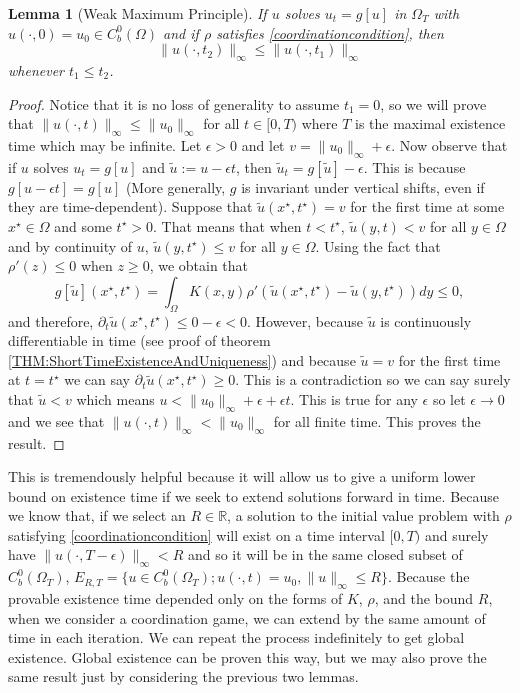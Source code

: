 \documentclass[aps,
preprint,
groupedaddress,
showkeys,
amsmath]{revtex4-2}
\newtheorem{lemma}{Lemma}
\begin{document}
\begin{lemma}[Weak Maximum Principle]\label{LEM:MaximumPrinciple}
        If $u$ solves $u_t = g[u]$ in $\Omega_T$ with $u(\cdot, 0)=u_0\in C^0_b(\Omega)$ and if $\rho$ satisfies \eqref{coordinationcondition}, then 
       \[\|u(\cdot, t_2)\|_\infty\leq\| u(\cdot , t_1)\|_\infty \] whenever $t_1\leq t_2$. 
    \end{lemma}
    \begin{proof}
        Notice that it is no loss of generality to assume $t_1=0$, so we will prove that $\|u(\cdot,t)\|_\infty\leq \|u_0\|_\infty$ for all $t\in [0,T)$ where $T$ is the maximal existence time which may be infinite. Let $\epsilon>0$ and let $v=\|u_0\|_\infty +\epsilon$. Now observe that if $u$ solves $u_t=g[u]$ and $\tilde{u}:=u-\epsilon t$, then $\tilde{u}_t=g[\tilde{u}]-\epsilon$. This is because $g[u-\epsilon t]=g[u]$ (More generally, $g$ is invariant under vertical shifts, even if they are time-dependent). Suppose that $\tilde{u}(x^\star,t^\star) = v$ for the first time at some $x^\star\in \Omega$ and some $t^\star>0$. That means that when  $t<t^\star$, $\tilde{u}(y,t)<v$ for all $y\in \Omega$ and by continuity of $u$, $\tilde{u}(y,t^\star)\leq v$ for all $y\in\Omega$. Using the fact that $\rho'(z)\leq 0$ when $z\geq 0$, we obtain that    
        \[g[\tilde{u}](x^\star,t^\star)=\int_\Omega K(x,y)\rho'(\tilde u(x^\star,t^\star)-\tilde u(y,t^\star))dy\leq 0, \] 
        and therefore, $\partial_t\tilde u(x^\star,t^\star)\leq 0-\epsilon<0$. However, because $\tilde{u}$ is continuously differentiable in time (see proof of theorem \ref{THM:ShortTimeExistenceAndUniqueness}) and because $\tilde u=v$ for the first time at $t=t^\star$ we can say $\partial_t\tilde u(x^\star,t^\star)\geq 0$. This is a contradiction so we can say surely that $\tilde{u} < v$ which means $u< \|u_0\|_\infty+\epsilon+\epsilon t$. This is true for any $\epsilon$ so let $\epsilon\rightarrow 0$ and we see that $\|u(\cdot, t)\|_\infty<\|u_0\|_\infty$ for all finite time. This proves the result.
    \end{proof}

    This is tremendously helpful because it will allow us to give a uniform lower bound on existence time if we seek to extend solutions forward in time. Because we know that, if we select an $R\in \mathbb{R}$, a solution to the initial value problem with $\rho$ satisfying \eqref{coordinationcondition} will exist on a time interval $[0,T)$ and surely have $\|u(\cdot,T-\epsilon)\|_\infty<R$ and so it will be in the same closed subset of $C^0_b(\Omega_T)$, $E_{R,T}=\{u\in C^0_b(\Omega_T);u(\cdot,t)=u_0, \|u\|_\infty\leq R\}$. Because the provable existence time depended only on the forms of $K$, $\rho$, and the bound $R$, when we consider a coordination game, we can extend by the same amount of time in each iteration. We can repeat the process indefinitely to get global existence. Global existence can be proven this way, but we may also prove the same result just by considering the previous two lemmas.
\end{document}
